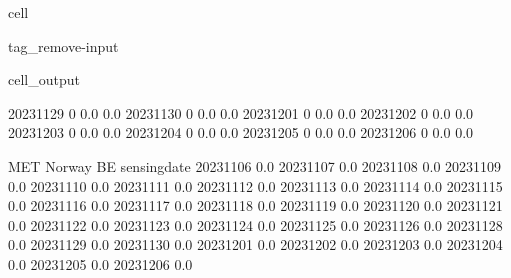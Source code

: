 \documentclass[letterpaper,10pt,english]{jupyterBook}
\begin{document}
\begin{sphinxuseclass}{cell}
\begin{sphinxuseclass}{tag_remove-input}
\begin{sphinxVerbatimOutput}
\begin{sphinxuseclass}{cell_output}
\begin{sphinxVerbatim}[commandchars=\\\{\}]
2023\PYGZhy{}11\PYGZhy{}29                0                    0.0                    0.0   
2023\PYGZhy{}11\PYGZhy{}30                0                    0.0                    0.0   
2023\PYGZhy{}12\PYGZhy{}01                0                    0.0                    0.0   
2023\PYGZhy{}12\PYGZhy{}02                0                    0.0                    0.0   
2023\PYGZhy{}12\PYGZhy{}03                0                    0.0                    0.0   
2023\PYGZhy{}12\PYGZhy{}04                0                    0.0                    0.0   
2023\PYGZhy{}12\PYGZhy{}05                0                    0.0                    0.0   
2023\PYGZhy{}12\PYGZhy{}06                0                    0.0                    0.0   

              MET Norway BE  
sensing\PYGZus{}date                 
2023\PYGZhy{}11\PYGZhy{}06              0.0  
2023\PYGZhy{}11\PYGZhy{}07              0.0  
2023\PYGZhy{}11\PYGZhy{}08              0.0  
2023\PYGZhy{}11\PYGZhy{}09              0.0  
2023\PYGZhy{}11\PYGZhy{}10              0.0  
2023\PYGZhy{}11\PYGZhy{}11              0.0  
2023\PYGZhy{}11\PYGZhy{}12              0.0  
2023\PYGZhy{}11\PYGZhy{}13              0.0  
2023\PYGZhy{}11\PYGZhy{}14              0.0  
2023\PYGZhy{}11\PYGZhy{}15              0.0  
2023\PYGZhy{}11\PYGZhy{}16              0.0  
2023\PYGZhy{}11\PYGZhy{}17              0.0  
2023\PYGZhy{}11\PYGZhy{}18              0.0  
2023\PYGZhy{}11\PYGZhy{}19              0.0  
2023\PYGZhy{}11\PYGZhy{}20              0.0  
2023\PYGZhy{}11\PYGZhy{}21              0.0  
2023\PYGZhy{}11\PYGZhy{}22              0.0  
2023\PYGZhy{}11\PYGZhy{}23              0.0  
2023\PYGZhy{}11\PYGZhy{}24              0.0  
2023\PYGZhy{}11\PYGZhy{}25              0.0  
2023\PYGZhy{}11\PYGZhy{}26              0.0  
2023\PYGZhy{}11\PYGZhy{}28              0.0  
2023\PYGZhy{}11\PYGZhy{}29              0.0  
2023\PYGZhy{}11\PYGZhy{}30              0.0  
2023\PYGZhy{}12\PYGZhy{}01              0.0  
2023\PYGZhy{}12\PYGZhy{}02              0.0  
2023\PYGZhy{}12\PYGZhy{}03              0.0  
2023\PYGZhy{}12\PYGZhy{}04              0.0  
2023\PYGZhy{}12\PYGZhy{}05              0.0  
2023\PYGZhy{}12\PYGZhy{}06              0.0  
\end{sphinxVerbatim}

\end{sphinxuseclass}\end{sphinxVerbatimOutput}

\end{sphinxuseclass}
\end{sphinxuseclass}
\end{document}
